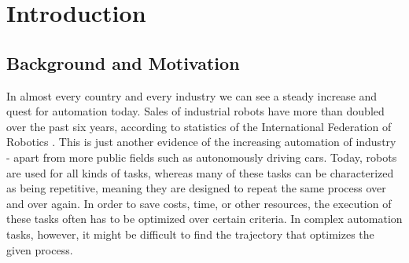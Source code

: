 \chapter{Introduction}
\section{Background and Motivation}
In almost every country and every industry we can see a steady increase and quest for automation today. Sales of industrial robots have more than doubled over the past six years, according to statistics of the International Federation of Robotics \cite{IFR2016}. This is just another evidence of the increasing automation of industry - apart from more public fields such as autonomously driving cars. Today, robots are used for all kinds of tasks, whereas many of these tasks can be characterized as being repetitive, meaning they are designed to repeat the same process over and over again. In order to save costs, time, or other resources, the execution of these tasks often has to be optimized over certain criteria. In complex automation tasks, however, it might be difficult to find the trajectory that optimizes the given process.

